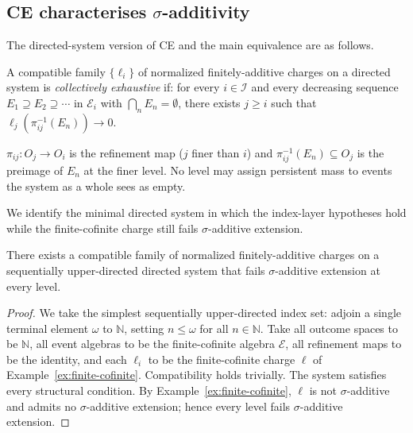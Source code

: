 \subsection{CE characterises $\sigma$-additivity}
\label{sec:sp1}

The directed-system version of CE and the main equivalence are as follows.

\begin{definition}
\label{def:collectively-exhaustive}
A compatible family $\{\ell_i\}$ of normalized finitely-additive charges on a directed system is \emph{collectively exhaustive} if: for every $i \in \mathcal{I}$ and every decreasing sequence $E_1 \supseteq E_2 \supseteq \cdots$ in $\mathcal{E}_i$ with $\bigcap_n E_n = \emptyset$, there exists $j \geq i$ such that $\ell_j(\pi_{ij}^{-1}(E_n)) \to 0$.
\end{definition}


\noindent $\pi_{ij} : O_j \to O_i$ is the refinement map ($j$ finer than
$i$) and $\pi_{ij}^{-1}(E_n) \subseteq O_j$ is the preimage of $E_n$ at the finer level.  No level may assign persistent mass to events the system as a whole sees as empty. 

We identify the minimal directed system in which the index-layer hypotheses hold while the finite-cofinite charge still fails $\sigma$-additive extension.

\begin{proposition}
\label{prop:independence}
There exists a compatible family of normalized finitely-additive charges on a sequentially upper-directed directed system that fails $\sigma$-additive extension at every level.
\end{proposition}

\begin{proof}
We take the simplest sequentially upper-directed index set: adjoin a single terminal element $\omega$ to $\mathbb{N}$, setting $n \leq \omega$ for all $n \in \mathbb{N}$.  Take all outcome spaces to be $\mathbb{N}$, all event algebras to be the finite-cofinite algebra $\mathcal{E}$, all refinement maps to be the identity, and each $\ell_i$ to be the finite-cofinite charge $\ell$ of Example~\ref{ex:finite-cofinite}.  Compatibility holds trivially.  The system satisfies every structural condition.  By Example~\ref{ex:finite-cofinite}, $\ell$ is not $\sigma$-additive and admits no $\sigma$-additive extension; hence every level fails $\sigma$-additive extension.
\end{proof}

